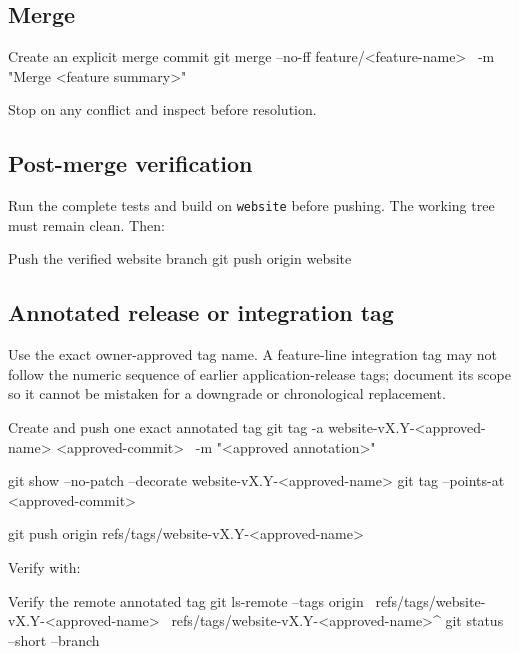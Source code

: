 \documentclass[11pt,letterpaper]{article}
\newcommand{\branchname}[1]{\texttt{#1}}
\begin{document}
\subsection{Merge}

\begin{commandbox}{Create an explicit merge commit}
git merge --no-ff feature/<feature-name> \
  -m "Merge <feature summary>"
\end{commandbox}

Stop on any conflict and inspect before resolution.

\subsection{Post-merge verification}

Run the complete tests and build on \branchname{website} before pushing. The
working tree must remain clean. Then:

\begin{commandbox}{Push the verified website branch}
git push origin website
\end{commandbox}

\subsection{Annotated release or integration tag}

Use the exact owner-approved tag name. A feature-line integration tag may not
follow the numeric sequence of earlier application-release tags; document its
scope so it cannot be mistaken for a downgrade or chronological replacement.

\begin{commandbox}{Create and push one exact annotated tag}
git tag -a website-vX.Y-<approved-name> <approved-commit> \
  -m "<approved annotation>"

git show --no-patch --decorate website-vX.Y-<approved-name>
git tag --points-at <approved-commit>

git push origin refs/tags/website-vX.Y-<approved-name>
\end{commandbox}

Verify with:

\begin{commandbox}{Verify the remote annotated tag}
git ls-remote --tags origin \
  refs/tags/website-vX.Y-<approved-name> \
  refs/tags/website-vX.Y-<approved-name>^{}
git status --short --branch
\end{commandbox}
\end{document}
